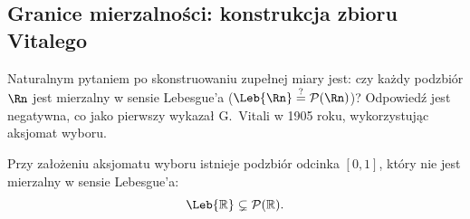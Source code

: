 \subsection{Granice mierzalności: konstrukcja zbioru Vitalego}

Naturalnym pytaniem po skonstruowaniu zupełnej miary jest: czy każdy podzbiór $\Rn$ jest mierzalny w sensie Lebesgue'a ($\Leb{\Rn} \stackrel{?}{=} \mathcal{P}(\Rn)$)? Odpowiedź jest negatywna, co jako pierwszy wykazał G.~Vitali w 1905 roku, wykorzystując aksjomat wyboru.

\begin{tw}\label{tw:vitali}
    Przy założeniu aksjomatu wyboru istnieje podzbiór odcinka $[0, 1]$, który nie jest mierzalny w sensie Lebesgue'a:
    \begin{equation*}
        \Leb{\mathbb{R}} \subsetneq \mathcal{P}(\mathbb{R}).
    \end{equation*}
\end{tw}

